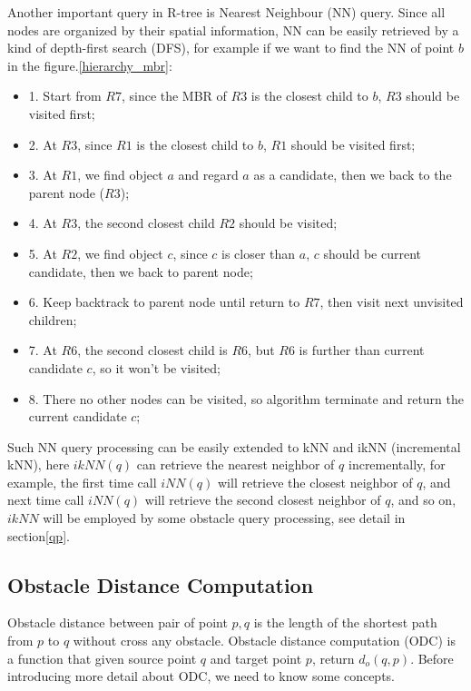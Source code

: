 Another important query in R-tree is Nearest Neighbour (NN) query. Since all nodes are organized by
their spatial information, NN can be easily retrieved by a kind of depth-first search (DFS), for example
if we want to find the NN of point $b$ in the figure.\ref{hierarchy_mbr}:

\begin{itemize}
  \item 1. Start from $R7$, since the MBR of $R3$ is the closest child to $b$, $R3$ should be visited first;
  \item 2. At $R3$, since $R1$ is the closest child to $b$, $R1$ should be visited first;
  \item 3. At $R1$, we find object $a$ and regard $a$ as a candidate, then we back to the parent node ($R3$);
  \item 4. At $R3$, the second closest child $R2$ should be visited;
  \item 5. At $R2$, we find object $c$, since $c$ is closer than $a$, $c$ should be current candidate,
  then we back to parent node;
  \item 6. Keep backtrack to parent node until return to $R7$, then visit next unvisited children;
  \item 7. At $R6$, the second closest child is $R6$, but $R6$ is further than current candidate $c$,
  so it won't be visited;
  \item 8. There no other nodes can be visited, so algorithm terminate and return the current candidate $c$;
\end{itemize}

Such NN query processing can be easily extended to kNN and ikNN (incremental kNN), here
$\mathit{ikNN(q)}$ can retrieve the nearest neighbor of $q$ incrementally,
for example, the first time call $\mathit{iNN(q)}$ will
retrieve the closest neighbor of $q$, and next time call $iNN(q)$ will retrieve the second
closest neighbor of $q$, and so on, $\mathit{ikNN}$ will be employed by some obstacle query processing,
see detail in section\ref{qp}.

\subsection{Obstacle Distance Computation}\label{odc}
Obstacle distance between pair of point $p,q$ is the length of the shortest path from $p$ to $q$
without cross any obstacle. Obstacle distance computation (ODC) is a function that given
source point $q$ and target point $p$, return $d_o(q, p)$.
Before introducing more detail about ODC, we need to know some concepts.

